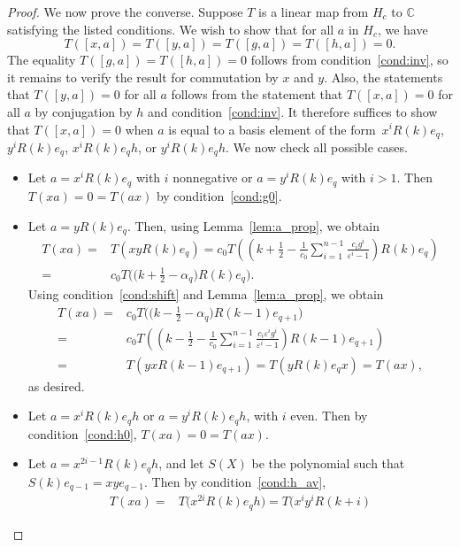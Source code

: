 \documentclass[pdftex]{sigma}
\newcommand\CC{\mathbb{C}}
\newcommand\eps{\varepsilon}
\newcommand\half{\ensuremath{\frac{1}{2}}}
\newcommand\thalf{\ensuremath{\tfrac12}}
\numberwithin{equation}{section}
\theoremstyle{definition}
\begin{document}
\begin{proof}
 We now prove the converse.
 Suppose $T$ is a linear map from $H_c$ to $\CC$
 satisfying the listed conditions.
 We wish to show that for all $a$ in $H_c$,
 we have
 \[
 T([x, a]) = T([y, a]) = T([g, a]) = T([h, a]) = 0.
 \]
 The equality $T([g, a]) = T([h, a]) = 0$ follows
 from condition~\ref{cond:inv},
 so it remains to verify the result for commutation by $x$ and $y$.
 Also, the statements that $T([y, a]) = 0$ for all $a$
 follows from the statement that $T([x, a]) = 0$ for all $a$
 by conjugation by $h$ and condition~\ref{cond:inv}.
 It therefore suffices to show that $T([x, a]) = 0$
 when $a$ is equal to a basis element
 of the form~$x^i R(k) e_q$, $y^i R(k) e_q$,
 $x^i R(k) e_q h$, or $y^i R(k) e_q h$.
 We now check all possible cases.
 \begin{itemize}\itemsep=0pt
 \item Let $a = x^i R(k) e_q$ with $i$ nonnegative
 or $a = y^i R(k) e_q$ with $i > 1$.
 Then $T(xa) = 0 = T(ax)$ by
 condition~\ref{cond:g0}.
 \item Let $a = y R(k) e_q$.
 Then, using Lemma~\ref{lem:a_prop}, we obtain
 \begin{align*}
 T(xa) ={}& T\left( xy R(k) e_q \right) = c_0 T\left( \left( k + \half -
 \frac1{c_0} \sum\limits_{i = 1}^{n - 1}
 \frac{c_i g^i}{\eps^i - 1} \right)
 R(k) e_q \right) \\
 ={}& c_0 T\bigl( \bigl( k + \thalf
 - \alpha_q \bigr) R(k) e_q \bigr).
 \end{align*}
 Using condition~\ref{cond:shift}
 and Lemma~\ref{lem:a_prop},
 we obtain
 \begin{align*}
 T(xa) ={}& c_0
 T\bigl( \bigl( k - \thalf - \alpha_q \bigr)
 R(k - 1) e_{q + 1} \bigr) \\
 ={}& c_0 T\left( \left( k - \half -
 \frac1{c_0} \sum\limits_{i = 1}^{n - 1}
 \frac{c_i \eps^i g^i}{\eps^i - 1} \right)
 R(k - 1) e_{q + 1} \right) \\
 ={}& T\left( yx R(k - 1) e_{q + 1} \right)= T\left( y R(k) e_q x \right)= T(ax),
 \end{align*}
 as desired.
 \item Let $a = x^i R(k) e_q h$
 or $a = y^i R(k) e_q h$,
 with $i$ even.
 Then by condition~\ref{cond:h0},
 $T(xa) = 0 = T(ax)$.
 \item Let $a = x^{2i - 1} R(k) e_q h$,
 and let $S(X)$ be the polynomial
 such that $S(k) e_{q - 1} = xy e_{q - 1}$.
 Then by condition~\ref{cond:h_av},
 \begin{align*}
 T(xa) ={}& T\bigl( x^{2i} R(k) e_q h \bigr)= T\bigl( x^i y^i R(k + i)

\end{align*}
\end{itemize}
\end{proof}
\end{document}
